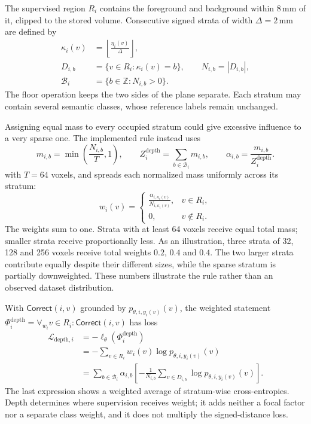 \documentclass[12pt,a4paper]{article}
\begin{document}
The supervised region $R_i$ contains the foreground and background
within $8\,\mathrm{mm}$ of it, clipped to the stored volume. Consecutive
signed strata of width $\Delta=2\,\mathrm{mm}$ are defined by
\begin{equation}
\begin{aligned}
\kappa_i(v)&=\left\lfloor\frac{\eta_i(v)}{\Delta}\right\rfloor,\\
D_{i,b}&=\{v\in R_i:\kappa_i(v)=b\},
\qquad N_{i,b}=|D_{i,b}|,\\
\mathcal{B}_i&=\{b\in\mathbb{Z}:N_{i,b}>0\}.
\end{aligned}
\label{eq:depth-strata}
\end{equation}
The floor operation keeps the two sides of the plane separate.
Each stratum may contain several semantic classes, whose reference
labels remain unchanged.

Assigning equal mass to every occupied stratum could give excessive
influence to a very sparse one. The implemented rule instead uses
\begin{equation}
 m_{i,b}=\min\left(\frac{N_{i,b}}{T},1\right),
\qquad
 Z_i^{\mathrm{depth}}=\sum_{b\in\mathcal{B}_i}m_{i,b},
\qquad
 \alpha_{i,b}=\frac{m_{i,b}}{Z_i^{\mathrm{depth}}}.
\label{eq:depth-stratum-masses}
\end{equation}
with $T=64$ voxels, and spreads each normalized mass uniformly across
its stratum:
\begin{equation}
 w_i(v)=
 \begin{cases}
 \displaystyle\frac{\alpha_{i,\kappa_i(v)}}{N_{i,\kappa_i(v)}},
       &v\in R_i,\\[0.6em]
 0,    &v\notin R_i.
 \end{cases}
\label{eq:depth-voxel-weights}
\end{equation}
The weights sum to one. Strata with at least 64 voxels receive equal
total mass; smaller strata receive proportionally less. As an
illustration, three strata of 32, 128 and 256 voxels receive total
weights $0.2$, $0.4$ and $0.4$. The two larger strata contribute
equally despite their different sizes, while the sparse stratum is
partially downweighted. These numbers illustrate the rule rather
than an observed dataset distribution.

With $\mathsf{Correct}(i,v)$ grounded by
$p_{\theta,i,y_i(v)}(v)$, the weighted statement
$\Phi_i^{\mathrm{depth}}=\forall_{w_i}v\in R_i:
\mathsf{Correct}(i,v)$ has loss
\begin{equation}
\begin{aligned}
\mathcal{L}_{\mathrm{depth},i}
 &=-\ell_\theta(\Phi_i^{\mathrm{depth}})\\
 &=-\sum_{v\in R_i}w_i(v)\log p_{\theta,i,y_i(v)}(v)\\
 &=\sum_{b\in\mathcal{B}_i}\alpha_{i,b}
   \left[-\frac{1}{N_{i,b}}\sum_{v\in D_{i,b}}
                    \log p_{\theta,i,y_i(v)}(v)\right].
\end{aligned}
\label{eq:depth-weighted-class-loss}
\end{equation}
The last expression shows a weighted average of stratum-wise
cross-entropies. Depth determines where supervision receives weight;
it adds neither a focal factor nor a separate class weight, and it
does not multiply the signed-distance loss.
\end{document}
